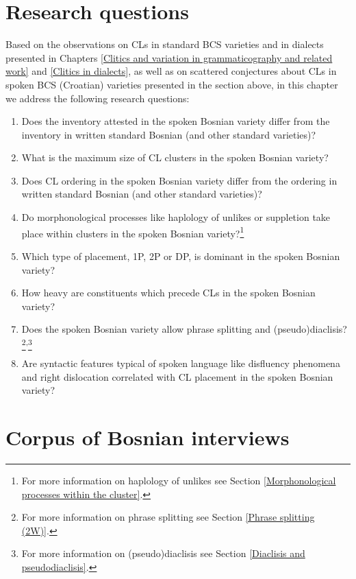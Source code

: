 \section{Research questions}
\label{RQ:9}
Based on the observations on CLs in standard BCS varieties and in dialects presented in Chapters \ref{Clitics and variation in grammaticography and related work} and \ref{Clitics in dialects}, as well as on scattered conjectures about CLs in spoken BCS (Croatian) varieties presented in the section above, in this chapter we address the following research questions:

\begin{enumerate}[label=RQ\arabic*:,ref=RQ\arabic*]
\item\label{8RQ1} Does the inventory attested in the spoken Bosnian variety differ from the inventory in written standard Bosnian (and other standard varieties)? 
\item\label{8RQ2} What is the maximum size of CL clusters in the spoken Bosnian variety? 
\item\label{8RQ3} Does CL ordering in the spoken Bosnian variety differ from the ordering in written standard Bosnian (and other standard varieties)?
\item\label{8RQ4} Do morphonological processes like haplology of unlikes or suppletion take place within clusters in the spoken Bosnian variety?\footnote{For more information on haplology of unlikes see Section \ref{Morphonological processes within the cluster}.} 
\item\label{8RQ5} Which type of placement, 1P, 2P or DP, is dominant in the spoken Bosnian variety? 
\item\label{8RQ6} How heavy are constituents which precede CLs in the spoken Bosnian variety? 
\item\label{8RQ7} Does the spoken Bosnian variety allow phrase splitting and (pseudo)\-di\-a\-cli\-sis?\footnote{For more information on phrase splitting see Section \ref{Phrase splitting (2W)}.}\textsuperscript{,}\footnote{For more information on (pseudo)diaclisis see Section \ref{Diaclisis and pseudodiaclisis}.}
\item\label{8RQ8} Are syntactic features typical of spoken language like disfluency phenomena and right dislocation correlated with CL placement in the spoken Bosnian variety?
\end{enumerate}

\section{Corpus of Bosnian interviews}
\label{Corpus of Bosnian interviews}
